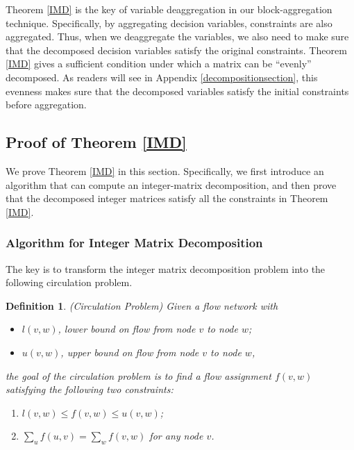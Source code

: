 \documentclass[letterpaper,twocolumn,10pt]{article}
\newtheorem{defn}[thm]{Definition}
\begin{document}
Theorem \ref{IMD} is the key of variable deaggregation in our block-aggregation technique. Specifically, by aggregating decision variables, constraints are also aggregated. Thus, when we deaggregate the variables, we also need to make sure that the decomposed decision variables satisfy the original constraints. Theorem \ref{IMD} gives a sufficient condition under which a matrix can be ``evenly'' decomposed. As readers will see in Appendix \ref{decompositionsection}, this evenness makes sure that the decomposed variables satisfy the initial constraints before aggregation.

\subsection{Proof of Theorem \ref{IMD}}
We prove Theorem \ref{IMD} in this section. Specifically, we first introduce an algorithm that can compute an integer-matrix decomposition, and then prove that the decomposed integer matrices satisfy all the constraints in Theorem \ref{IMD}.

\subsubsection{Algorithm for Integer Matrix Decomposition}
The key is to transform the integer matrix decomposition problem into the following circulation problem.
\begin{defn}\label{circulation}
(Circulation Problem) Given a flow network with
\begin{itemize}
  \item $l(v,w)$, lower bound on flow from node $v$ to node $w$;
  \item $u(v,w)$, upper bound on flow from node $v$ to node $w$,
\end{itemize}
the goal of the circulation problem is to find a flow assignment $f(v,w)$ satisfying the following two constraints:
\begin{enumerate}
  \item $l(v,w)\leq f(v,w)\leq u(v,w)$;
  \item $\sum_u f(u,v) = \sum_w f(v,w)$ for any node $v$.
\end{enumerate}
\end{defn}
\end{document}
